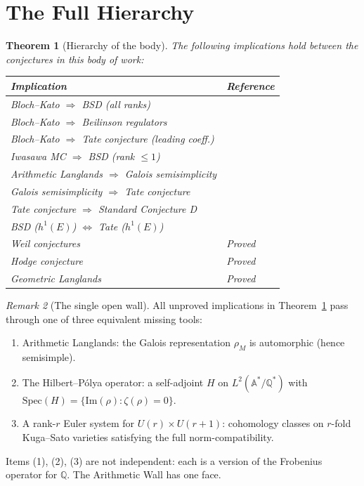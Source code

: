 \documentclass[12pt]{article}
\newtheorem{theorem}{Theorem}
\theoremstyle{definition}
\theoremstyle{remark}
\newtheorem{remark}[theorem]{Remark}
\begin{document}
\section{The Full Hierarchy}

\begin{theorem}[Hierarchy of the body]\label{thm:hier}
The following implications hold between the conjectures in this body of work:
\begin{center}
\begin{tabular}{@{}ll@{}}
\toprule
Implication & Reference \\
\midrule
Bloch--Kato $\Rightarrow$ BSD (all ranks) & \cite{blochkato,bsd2} \\
Bloch--Kato $\Rightarrow$ Beilinson regulators & \cite{motives,blochkato} \\
Bloch--Kato $\Rightarrow$ Tate conjecture (leading coeff.) & \cite{tate,blochkato} \\
Iwasawa MC $\Rightarrow$ BSD (rank $\leq 1$) & \cite{iwasawa} \\
Arithmetic Langlands $\Rightarrow$ Galois semisimplicity & \cite{langlands,tate} \\
Galois semisimplicity $\Rightarrow$ Tate conjecture & \cite{tate} \\
Tate conjecture $\Rightarrow$ Standard Conjecture D & \cite{motives} \\
BSD ($h^1(E)$) $\Leftrightarrow$ Tate ($h^1(E)$) & \cite{tate,bsd2} \\
Weil conjectures & Proved \cite{weil} \\
Hodge conjecture & Proved \cite{hodge2} \\
Geometric Langlands & Proved \cite{langlands} \\
\bottomrule
\end{tabular}
\end{center}
\end{theorem}

\begin{remark}[The single open wall]
All unproved implications in Theorem~\ref{thm:hier} pass through one
of three equivalent missing tools:
\begin{enumerate}
\item Arithmetic Langlands: the Galois representation $\rho_M$ is automorphic
  (hence semisimple).
\item The Hilbert--Pólya operator: a self-adjoint $H$ on $L^2(\mathbb{A}^*/\mathbb{Q}^*)$
  with $\mathrm{Spec}(H) = \{\mathrm{Im}(\rho): \zeta(\rho)=0\}$.
\item A rank-$r$ Euler system for $U(r) \times U(r+1)$: cohomology classes on
  $r$-fold Kuga--Sato varieties satisfying the full norm-compatibility.
\end{enumerate}
Items (1), (2), (3) are not independent: each is a version of the
Frobenius operator for $\mathbb{Q}$. The Arithmetic Wall has one face.
\end{remark}
\end{document}
